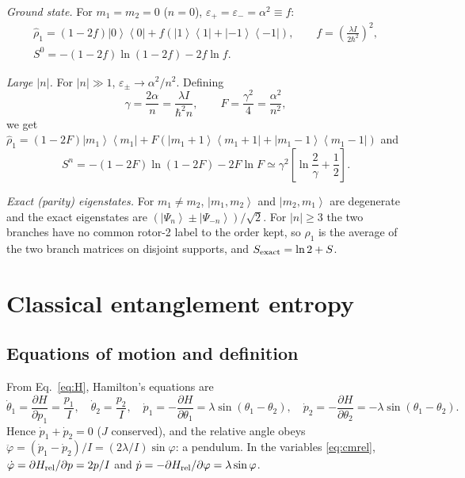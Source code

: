 \documentclass[aps,pra,onecolumn,notitlepage,nofootinbib,11pt]{revtex4-2}
\newcommand{\ket}[1]{\left|#1\right\rangle}
\newcommand{\ketbra}[2]{\left|#1\right\rangle\!\left\langle#2\right|}
\newcommand{\epsp}{\varepsilon_{+}}
\newcommand{\epsm}{\varepsilon_{-}}
\begin{document}
\emph{Ground state.} For $m_{1}=m_{2}=0$ ($n=0$), $\epsp=\epsm=\alpha^{2}\equiv f$:
\begin{equation}
\begin{gathered}
\hat\rho_{1}=(1-2f)\ketbra00+f\left(\ketbra11+\ketbra{-1}{-1}\right),\qquad
f=\left(\frac{\lambda I}{2\hbar^{2}}\right)^{2},\\
S^{0}=-(1-2f)\ln(1-2f)-2f\ln f .
\end{gathered}
\label{eq:S0}
\end{equation}

\emph{Large $|n|$.} For $|n|\gg1$, $\varepsilon_{\pm}\to\alpha^{2}/n^{2}$. Defining
\begin{equation}
\gamma=\frac{2\alpha}{n}=\frac{\lambda I}{\hbar^{2}n},\qquad F=\frac{\gamma^{2}}{4}=\frac{\alpha^{2}}{n^{2}},
\label{eq:gammaF}
\end{equation}
we get $\hat\rho_{1}=(1-2F)\ketbra{m_{1}}{m_{1}}+F(\ketbra{m_{1}+1}{m_{1}+1}
+\ketbra{m_{1}-1}{m_{1}-1})$ and
\begin{equation}
S^{n}=-(1-2F)\ln(1-2F)-2F\ln F\simeq\gamma^{2}\left[\ln\frac{2}{\gamma}+\frac12\right].
\label{eq:Sn}
\end{equation}

\emph{Exact (parity) eigenstates.} For $m_{1}\neq m_{2}$, $\ket{m_{1},m_{2}}$ and
$\ket{m_{2},m_{1}}$ are degenerate and the exact eigenstates are
$(\ket{\Psi_{n}}\pm\ket{\Psi_{-n}})/\sqrt2$. For $|n|\ge3$ the two branches have no
common rotor-2 label to the order kept, so $\hat\rho_{1}$ is the average of the two
branch matrices on disjoint supports, and $S_{\rm exact}=\ln2+S$.

\section{Classical entanglement entropy}

\subsection{Equations of motion and definition}

From Eq.~\eqref{eq:H}, Hamilton's equations are
\begin{equation}
\dot\theta_{1}=\frac{\partial H}{\partial p_{1}}=\frac{p_{1}}{I},\quad
\dot\theta_{2}=\frac{p_{2}}{I},\quad
\dot p_{1}=-\frac{\partial H}{\partial\theta_{1}}=\lambda\sin(\theta_{1}-\theta_{2}),\quad
\dot p_{2}=-\frac{\partial H}{\partial\theta_{2}}=-\lambda\sin(\theta_{1}-\theta_{2}).
\label{eq:eom}
\end{equation}
Hence $\dot p_{1}+\dot p_{2}=0$ ($J$ conserved), and the relative angle obeys
$\ddot\varphi=(\dot p_{1}-\dot p_{2})/I=(2\lambda/I)\sin\varphi$: a pendulum. In the
variables \eqref{eq:cmrel}, $\dot\varphi=\partial H_{\rm rel}/\partial p=2p/I$ and
$\dot p=-\partial H_{\rm rel}/\partial\varphi=\lambda\sin\varphi$.
\end{document}
